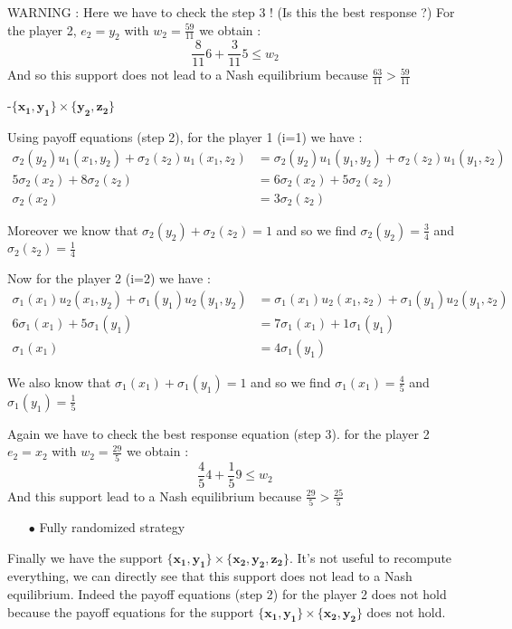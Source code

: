 WARNING : Here we have to check the step 3 ! (Is this the best response ?) For the player 2, $e_2=y_2$ with $w_2=\frac{59}{11}$ we obtain :
\begin{equation*}
    \frac{8}{11}6 + \frac{3}{11}5 \le w_2
\end{equation*}
And so this support does not lead to a Nash equilibrium because $\frac{63}{11}>\frac{59}{11}$

-$\mathbf{\{x_1,y_1\}}\times\mathbf{\{y_2,z_2\}}$

Using payoff equations (step 2), for the player 1 (i=1) we have : 
\begin{align*}
 \sigma_2(y_2)u_1(x_1,y_2) + \sigma_2(z_2)u_1(x_1,z_2) &= \sigma_2(y_2)u_1(y_1,y_2) + \sigma_2(z_2)u_1(y_1,z_2) \\
 5\sigma_2(x_2)+8\sigma_2(z_2)&= 6\sigma_2(x_2) + 5\sigma_2(z_2) \\
 \sigma_2(x_2)&=3\sigma_2(z_2)
\end{align*}

Moreover we know that $\sigma_2(y_2) + \sigma_2(z_2) = 1$ and so we find $\sigma_2(y_2)=\frac{3}{4}$ and $\sigma_2(z_2)=\frac{1}{4}$

Now for the player 2 (i=2) we have : 
\begin{align*}
 \sigma_1(x_1)u_2(x_1,y_2) + \sigma_1(y_1)u_2(y_1,y_2) &= \sigma_1(x_1)u_2(x_1,z_2) + \sigma_1(y_1)u_2(y_1,z_2) \\
 6\sigma_1(x_1)+5\sigma_1(y_1)&= 7\sigma_1(x_1) + 1\sigma_1(y_1) \\
 \sigma_1(x_1)&=4\sigma_1(y_1)
\end{align*}

We also know that $\sigma_1(x_1) + \sigma_1(y_1) = 1$ and so we find $\sigma_1(x_1)=\frac{4}{5}$ and $\sigma_1(y_1)=\frac{1}{5}$

Again we have to check the best response equation (step 3). for the player 2 $e_2=x_2$ with $w_2=\frac{29}{5}$ we obtain :
\begin{equation*}
    \frac{4}{5}4 + \frac{1}{5}9 \le w_2
\end{equation*}
And this support lead to a Nash equilibrium because $\frac{29}{5}>\frac{25}{5}$



\begin{itemize}
  \item[$\bullet$] Fully randomized strategy 
\end{itemize}

Finally we have the support $\mathbf{\{x_1,y_1\}}\times\mathbf{\{x_2,y_2,z_2\}}$. It's not useful to recompute everything, we can directly see that this support does not lead to a Nash equilibrium. Indeed the payoff equations (step 2) for the player 2 does not hold because the payoff equations for the support $\mathbf{\{x_1,y_1\}}\times\mathbf{\{x_2,y_2\}}$  does not hold.


